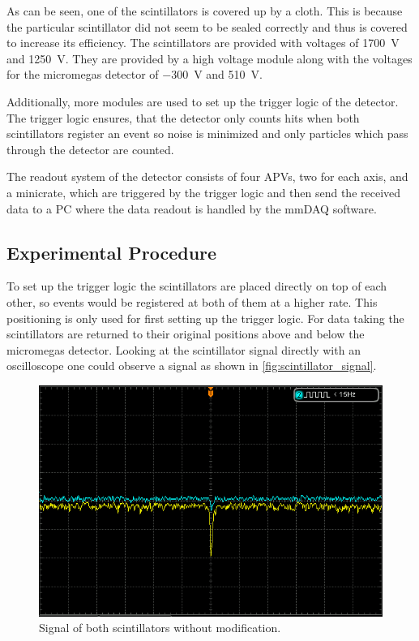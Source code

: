 \documentclass[sn-mathphys-num,iicol]{sn-jnl}
\theoremstyle{thmstyleone}
\theoremstyle{thmstyletwo}
\theoremstyle{thmstylethree}
\begin{document}
As can be seen, one of the scintillators is covered up by a cloth. 
This is because the particular scintillator did not seem to be sealed correctly and thus is covered to increase its efficiency.
The scintillators are provided with voltages of \SI{1700}{\volt} and \SI{1250}{\volt}. 
They are provided by a high voltage module along with the voltages for the micromegas detector of \SI{-300}{\volt} and \SI{510}{\volt}.

Additionally, more modules are used to set up the trigger logic of the detector.
The trigger logic ensures, that the detector only counts hits when both scintillators register an event so noise is minimized and only particles which pass through the detector are counted.

The readout system of the detector consists of four APVs, two for each axis, and a minicrate, which are triggered by the trigger logic and then send the received data to a PC where the data readout is handled by the mmDAQ software.


\subsection{Experimental Procedure}
To set up the trigger logic the scintillators are placed directly on top of each other, so events would be registered at both of them at a higher rate.
This positioning is only used for first setting up the trigger logic.
For data taking the scintillators are returned to their original positions above and below the micromegas detector.
Looking at the scintillator signal directly with an oscilloscope one could observe a signal as shown in \autoref{fig:scintillator_signal}.

\begin{figure}
  \includegraphics[width=\linewidth]{figures/DS1Z_QuickPrint5_cropped.png}
  \caption{Signal of both scintillators without modification.}
  \label{fig:scintillator_signal}
\end{figure}
\end{document}
